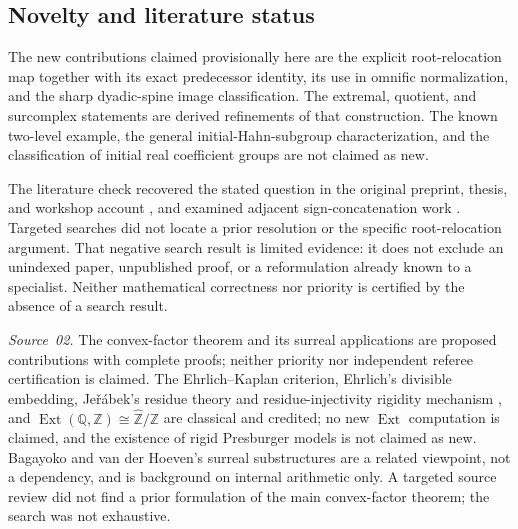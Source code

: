 \documentclass[11pt]{article}
\theoremstyle{definition}
\theoremstyle{remark}
\newcommand{\Z}{\mathbb{Z}}
\newcommand{\Q}{\mathbb{Q}}
\newcommand{\Zhat}{\widehat{\Z}}
\newcommand{\Ext}{\operatorname{Ext}}
\begin{document}
\subsection{Novelty and literature status}
The new contributions claimed provisionally here are the explicit
root-relocation map together with its exact predecessor identity, its
use in omnific normalization, and the sharp dyadic-spine image
classification. The extremal, quotient, and surcomplex statements are
derived refinements of that construction. The known two-level example,
the general initial-Hahn-subgroup characterization, and the classification
of initial real coefficient groups are not claimed as new.

The literature check recovered the stated question in the original
preprint, thesis, and workshop account \cite{EK,Kaplan,Workshop}, and
examined adjacent sign-concatenation work \cite{BagHoeven}. Targeted
searches did not locate a prior resolution or the specific root-relocation
argument. That negative search result is limited evidence: it does not
exclude an unindexed paper, unpublished proof, or a reformulation already
known to a specialist. Neither mathematical correctness nor priority is
certified by the absence of a search result.

\emph{Source~02.} The convex-factor theorem and its surreal applications
are proposed contributions with complete proofs; neither priority nor
independent referee certification is claimed. The Ehrlich--Kaplan
criterion, Ehrlich's divisible embedding, Je\v r\'abek's residue theory
and residue-injectivity rigidity mechanism \cite{Jerabek}, and
$\Ext(\Q,\Z)\cong\Zhat/\Z$ \cite{Strickland} are classical and credited;
no new $\Ext$ computation is claimed, and the existence of rigid
Presburger models is not claimed as new. Bagayoko and van der Hoeven's
surreal substructures \cite{BagHoeven} are a related viewpoint, not a
dependency, and \cite{EnayatHamkinsWcislo} is background on internal
arithmetic only. A targeted source review did not find a prior
formulation of the main convex-factor theorem; the search was not
exhaustive.
\end{document}
